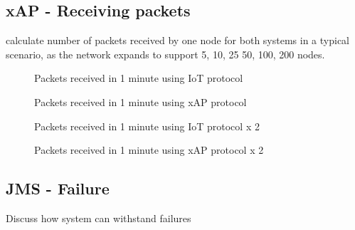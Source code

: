 \subsection{xAP - Receiving packets} %
\label{sub:xap}

calculate number of packets received by one node for both systems in a typical scenario, as the network expands to support 5, 10, 25 50, 100, 200 nodes.


\begin{figure}[h]
\begin{center}
\begin{minipage}{.5\textwidth}

\caption{Packets received in 1 minute using IoT protocol}
\label{graph:IoT1}
\end{minipage}%
\begin{minipage}{.5\textwidth}

\caption{Packets received in 1 minute using xAP protocol}
\label{graph:IoT1}
\end{minipage}
\end{center}
\end{figure}



\begin{figure}[h]
\begin{center}
\begin{minipage}{.5\textwidth}

\caption{Packets received in 1 minute using IoT protocol x 2}
\label{graph:IoT2}
\end{minipage}%
\begin{minipage}{.5\textwidth}

\caption{Packets received in 1 minute using xAP protocol x 2}
\label{graph:IoT2}
\end{minipage}
\end{center}
\end{figure}

\subsection{JMS - Failure} %
\label{sub:jms_failure}
Discuss how system can withstand failures



